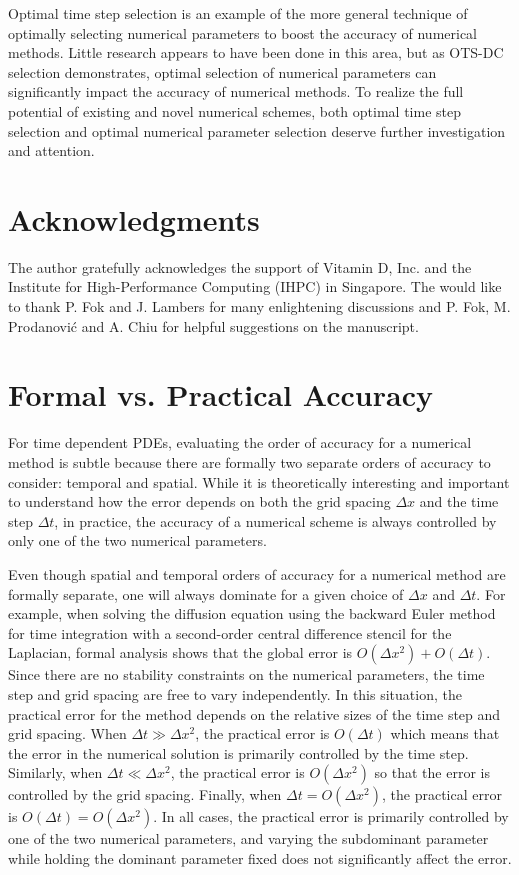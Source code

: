 \documentclass[fleqn,12pt,twoside]{article}
\def\dt{\Delta t}
\def\dx{\Delta x}
\begin{document}
Optimal time step selection is an example of the more general technique
of optimally selecting numerical parameters to boost the accuracy of 
numerical methods.  Little research appears to have been done in this area,
but as OTS-DC selection demonstrates, optimal selection of numerical 
parameters can significantly impact the accuracy of numerical methods.  To 
realize the full potential of existing and novel numerical schemes, 
both optimal time step selection and optimal numerical parameter selection 
deserve further investigation and attention.


\section*{Acknowledgments}
The author gratefully acknowledges the support of Vitamin D, Inc.
and the Institute for High-Performance Computing (IHPC) in Singapore. 
The would like to thank P. Fok and J. Lambers for many enlightening 
discussions and P. Fok, M. Prodanovi\'c and A. Chiu for helpful suggestions 
on the manuscript.  


\appendix
\section{Formal vs. Practical Accuracy
         \label{app:formal_vs_practical_accuracy} }
For time dependent PDEs, evaluating the order of accuracy for a numerical
method is subtle because there are formally two separate orders of accuracy 
to consider:  temporal and spatial.  While it is theoretically
interesting and important to understand how the error depends on both the 
grid spacing $\dx$ and the time step $\dt$, in practice, the accuracy 
of a numerical scheme is always controlled by only one of the two numerical
parameters.  

Even though spatial and temporal orders of accuracy for a numerical method
are formally separate, one will always dominate for a given choice of 
$\dx$ and $\dt$.  For example, when solving the diffusion equation 
using the backward Euler method for time integration with a second-order 
central difference stencil for the Laplacian, formal analysis shows that 
the global error is $O(\dx^2) + O(\dt)$.  Since there are no 
stability constraints on the numerical parameters, the time
step and grid spacing are free to vary independently.  In this situation, the 
practical error for the method depends on the relative sizes of the time step 
and grid spacing.  When $\dt \gg \dx^2$, the practical error is 
$O(\dt)$ which means that the error in the numerical solution is 
primarily controlled by the time step.  Similarly, when 
$\dt \ll \dx^2$, the practical error is $O(\dx^2)$ so that 
the error is controlled by the grid spacing.  Finally, when 
$\dt  = O(\dx^2)$, the practical error is 
$O(\dt) = O(\dx^2)$.  In all cases, the practical error is 
primarily controlled by one of the two numerical parameters, and varying
the subdominant parameter while holding the dominant parameter fixed does 
not significantly affect the error.
 
\end{document}
